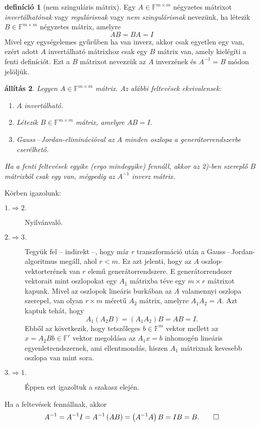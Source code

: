 \documentclass[9pt, a4paper, showtrims]{memoir}
\makeatletter
\renewenvironment{proof}[1][\proofname]
    {\par\pushQED{\qed}%
    \normalfont \topsep6\p@\@plus6\p@\relax
    \trivlist
    \item[\hskip\labelsep
        \itshape
    #1\@addpunct{:}]\ignorespaces}
    {\popQED\endtrivlist\@endpefalse}
\theoremstyle{plain}
\newtheorem{proposition}{állítás}[chapter]
\theoremstyle{remark}
\theoremstyle{definition}
\newtheorem{definition}[proposition]{definíció}
\makeatother
\begin{document}
\begin{definition}[nem szinguláris mátrix]
	Egy $A\in\mathbb{F}^{m\times m}$ négyzetes mátrixot
	\emph{invertálhatónak} vagy
	\emph{regulárisnak} vagy \emph{nem szingulárisnak} nevezünk,
	ha létezik $B\in\mathbb{F}^{m\times m}$ négyzetes mátrix,
	amelyre
	\[
		AB=BA=I
	\]
	Mivel egy egységelemes gyűrűben ha van inverz, akkor csak egyetlen egy van,
	ezért adott $A$ invertálható mátrixhoz csak egy $B$ mátrix van, amely kielégíti a fenti definíciót.
	Ezt a $B$ mátrixot nevezzük az $A$ inverzének és $A^{-1}=B$ módon jelöljük.
\end{definition}

\begin{proposition}
	Legyen $A\in\mathbb{F}^{m\times m}$ mátrix. Az alábbi feltevések ekvivalensek:
	\begin{enumerate}
		\item
		      $A$ invertálható.
		\item
		      Létezik $B\in\mathbb{F}^{m\times m}$ mátrix, amelyre
		      \begin{math}
			      AB=I.
		      \end{math}
		\item
		      Gauss\,--\,Jordan-eliminációval  az $A$ minden oszlopa a generátorrendszerbe cserélhető.
	\end{enumerate}
	Ha a fenti feltevések egyike (ergo mindegyike) fennáll,
	akkor az 2)-ben szereplő $B$ mátrixból csak egy van,
	mégpedig az $A^{-1}$ inverz mátrix.
\end{proposition}
\begin{proof}
	Körben igazolunk:
	\begin{description}
		\item[$1.\Rightarrow 2.$] Nyilvánvaló.
		\item[$2.\Rightarrow 3.$]
		      Tegyük fel -- indirekt --, hogy már $r$ transzformáció után a Gauss\,--\,Jordan-algoritmus megáll, ahol $r<m$.
		      Ez azt jelenti, hogy az $A$ oszlop-vektorterének van $r$ elemű generátorrendszere.
		      E generátorrendszer vektorait mint oszlopokat egy $A_1$ mátrixba téve egy $m\times r$ mátrixot kapunk.
		      Mivel az oszlopok lineáris burkában az $A$ valamennyi oszlopa szerepel,
		      van olyan $r\times m$ méretű $A_2$ mátrix, amelyre
		      \(
		      A_1A_2=A.
		      \)
		      Azt kaptuk tehát, hogy
		      \[
			      A_1\left( A_2B \right)=\left( A_1A_2 \right)B=AB=I.
		      \]
		      Ebből az következik,
		      hogy tetszőleges $b\in\mathbb{F}^{m}$ vektor mellett az
		      \begin{math}
			      x=A_2Bb\in\mathbb{F}^{r}
		      \end{math}
		      vektor megoldása az $A_1x=b$ inhomogén lineáris egyenletrendszernek,
		      ami ellentmondás, hiszen $A_1$ mátrixnak kevesebb oszlopa van mint sora.
		\item[$3.\Rightarrow 1.$] Éppen ezt igazoltuk a szakasz elején.
	\end{description}
	Ha a feltevések fennállnak, akkor
	\[
		A^{-1}=A^{-1}I=A^{-1}\left( AB \right)=\left( A^{-1}A \right)B=IB=B.\qedhere
	\]
\end{proof}
\end{document}

